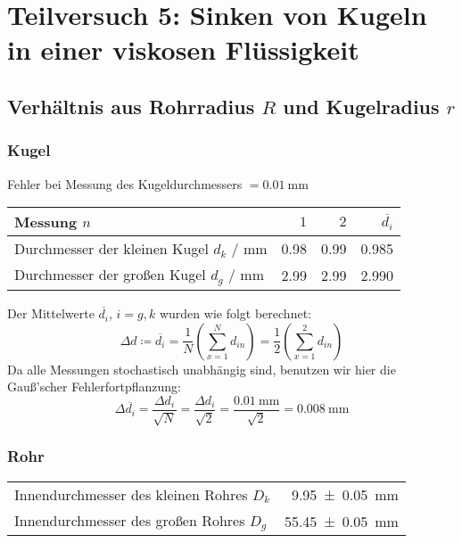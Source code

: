 \setcounter{section}{4}
\section{Teilversuch 5: Sinken von Kugeln in einer viskosen Flüssigkeit}
	\subsection{Verhältnis aus Rohrradius $R$ und Kugelradius $r$}
		\subsubsection{Kugel}
			Fehler bei Messung des Kugeldurchmessers $= \SI{0.01}{\milli\meter}$

			\begin{center}
				\begin{tabular}{l r r r}
					\toprule
					Messung $n$ & $1$ & $2$ & $\overbar{d_i}$\\
					\midrule
					Durchmesser der kleinen Kugel $d_k$ / \si{\milli\meter} & \num{0.98} & \num{0.99} & \num{0.985}\\
					Durchmesser der großen Kugel $d_g$ / \si{\milli\meter} & \num{2.99} & \num{2.99} & \num{2.990} \\
					\bottomrule
				\end{tabular}
			\end{center}
			Der Mittelwerte $\overbar{d_i}$, $i = g, k$ wurden wie folgt berechnet:
	        \begin{equation}
	            \Delta d \coloneqq \overbar{d_i} = \frac{1}{N} \left(\sum_{x=1}^{N} d_{in} \right) = \frac{1}{2} \left(\sum_{x=1}^{2} d_{in} \right) \label{eqn:mittelwert}
	        \end{equation}
	        \newpage
	        Da alle Messungen stochastisch unabhängig sind, benutzen wir hier die Gauß'scher Fehlerfortpflanzung:
	        \begin{equation}
	            \Delta \overbar{d_i} = \frac{\Delta d_i}{\sqrt{N}} = \frac{\Delta d_i}{\sqrt{2}} = \frac{\SI{0.01}{\milli\meter}}{\sqrt{2}} = \SI{0.008}{\milli\meter} \label{eqn:mittelfehler}
	        \end{equation}

	    \subsubsection{Rohr}
		    \begin{center}
		    	\begin{tabular}{l r}
		    		Innendurchmesser des kleinen Rohres $D_k$ & \SI{9.95(5)}{\milli\meter} \\
		    		Innendurchmesser des großen Rohres $D_g$  & \SI{55.45(5)}{\milli\meter} \\
		    	\end{tabular}
		    \end{center}

